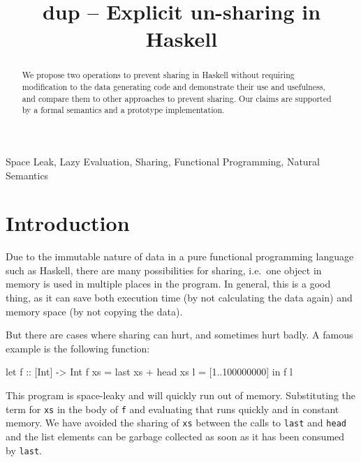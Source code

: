 \documentclass[preprint]{sigplanconf}
\title{dup -- Explicit un-sharing in Haskell}
\theoremstyle{nonumberplain}
\newcommand{\li}{\lstinline[style=Haskell]}
\begin{document}
\maketitle

\begin{abstract}
We propose two operations to prevent sharing in Haskell without requiring modification to the data generating code and demonstrate their use and usefulness, and compare them to other approaches to prevent sharing. Our claims are supported by a formal semantics and a prototype implementation.
\end{abstract}



\keywords Space Leak, Lazy Evaluation, Sharing, Functional Programming, Natural Semantics


\section{Introduction}

Due to the immutable nature of data in a pure functional programming language such as Haskell, there are many possibilities for sharing, i.e.\ one object in memory is used in multiple places in the program. In general, this is a good thing, as it can save both execution time (by not calculating the data again) and memory space (by not copying the data).

But there are cases where sharing can hurt, and sometimes hurt badly. A famous example is the following function:
\begin{haskell}
let f :: [Int] -> Int
    f xs = last xs + head xs
    l = [1..100000000]
in  f l
\end{haskell}
This program is space-leaky and will quickly run out of memory. Substituting the term for \li-xs- in the body of \lstinline-f- and evaluating that runs quickly and in constant memory. We have avoided the sharing of \lstinline-xs- between the calls to \lstinline-last- and \lstinline-head- and the list elements can be garbage collected as soon as it has been consumed by \lstinline-last-.
\end{document}

